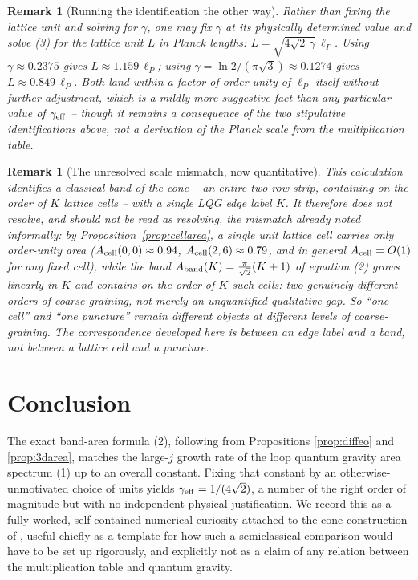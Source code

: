 \documentclass[11pt]{amsart}
\newtheorem{remark}[proposition]{Remark}
\theoremstyle{remark}
\begin{document}
\begin{remark}[Running the identification the other way]
Rather than fixing the lattice unit and solving for $\gamma$, one may fix $\gamma$ at
its physically determined value and solve (3) for the lattice unit $L$ in Planck
lengths: $L=\sqrt{4\sqrt2\,\gamma}\,\ell_P$. Using $\gamma\approx0.2375$
\cite{Meissner2004} gives $L\approx1.159\,\ell_P$; using
$\gamma=\ln2/(\pi\sqrt3)\approx0.1274$ \cite{Ashtekar-Baez-Krasnov2000} gives
$L\approx0.849\,\ell_P$. Both land within a factor of order unity of $\ell_P$ itself
without further adjustment, which is a mildly more suggestive fact than any particular
value of $\gamma_{\rm eff}$ -- though it remains a consequence of the two stipulative
identifications above, not a derivation of the Planck scale from the multiplication
table.
\end{remark}

\begin{remark}[The unresolved scale mismatch, now quantitative]
This calculation identifies a classical \emph{band} of the cone -- an entire two-row
strip, containing on the order of $K$ lattice cells -- with a \emph{single} LQG edge
label $K$. It therefore does not resolve, and should not be read as resolving, the
mismatch already noted informally: by Proposition~\ref{prop:cellarea}, a single unit
lattice cell carries only order-unity area ($A_{\rm cell}(0,0)\approx0.94$,
$A_{\rm cell}(2,6)\approx0.79$, and in general $A_{\rm cell}=O(1)$ for any fixed cell),
while the band $A_{\rm band}(K)=\tfrac\pi{\sqrt2}(K+1)$ of equation (2) grows linearly in
$K$ and contains on the order of $K$ such cells: two genuinely different orders of
coarse-graining, not merely an unquantified qualitative gap. So ``one cell'' and ``one
puncture'' remain different objects at different
levels of coarse-graining. The correspondence developed here is between an edge label
and a \emph{band}, not between a lattice cell and a puncture.
\end{remark}

\section{Conclusion}

The exact band-area formula (2), following from Propositions \ref{prop:diffeo}
and \ref{prop:3darea}, matches the large-$j$ growth rate of the loop quantum gravity
area spectrum (1) up to an overall constant. Fixing that constant by an
otherwise-unmotivated choice of units yields $\gamma_{\rm eff}=1/(4\sqrt2)$, a number
of the right order of magnitude but with no independent physical justification. We
record this as a fully worked, self-contained numerical curiosity attached to the
cone construction of \cite{Ebert2026}, useful chiefly as a template for how such a
semiclassical comparison would have to be set up rigorously, and explicitly not as a
claim of any relation between the multiplication table and quantum gravity.
\end{document}
